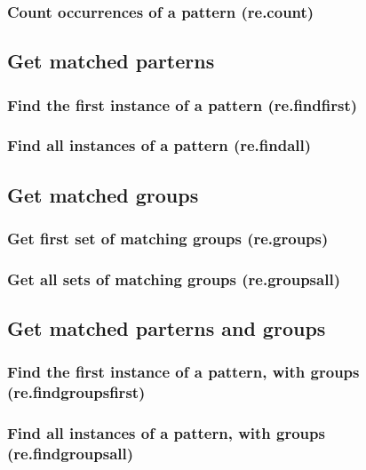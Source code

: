 \documentclass{article}
\theoremstyle{definition}
\begin{document}
\subsubsection{Count occurrences of a pattern (re.count)}

\subsection{Get matched parterns}

\subsubsection{Find the first instance of a pattern (re.findfirst)}

\subsubsection{Find all instances of a pattern (re.findall)}

\subsection{Get matched groups}

\subsubsection{Get first set of matching groups (re.groups)}

\subsubsection{Get all sets of matching groups (re.groupsall)}

\subsection{Get matched parterns and groups}

\subsubsection{Find the first instance of a pattern, with groups (re.findgroupsfirst)}

\subsubsection{Find all instances of a pattern, with groups (re.findgroupsall)}
\end{document}
